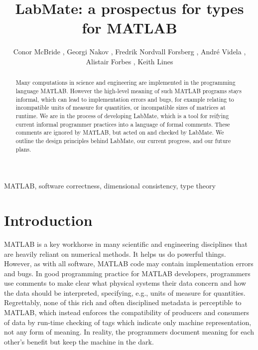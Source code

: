 \documentclass{IMEKO2024}
\begin{document}
\title{LabMate: a prospectus for types for MATLAB}
\author{Conor McBride  , Georgi Nakov  , Fredrik Nordvall Forsberg  , Andr\'e Videla  , Alistair Forbes  , Keith Lines  }
\maketitle

\begin{abstract}
  Many computations in science and engineering are implemented in the
  programming language MATLAB. However the high-level meaning of such
  MATLAB programs stays informal, which can lead to implementation
  errors and bugs, for example relating to incompatible units of
  measure for quantities, or incompatible sizes of matrices at
  runtime. We are in the process of developing LabMate, which is a
  tool for reifying current informal programmer practices into a
  language of formal comments. These comments are ignored by MATLAB,
  but acted on and checked by LabMate. We outline the design
  principles behind LabMate, our current progress, and our future
  plans.
\end{abstract}

\begin{keywords}
  MATLAB, software correctness, dimensional consistency, type theory
\end{keywords}

\section{Introduction}

MATLAB is a key workhorse in many scientific and engineering
disciplines that are heavily reliant on numerical methods. It helps us
do powerful things. However, as with all software, MATLAB code may
contain implementation errors and bugs. In good programming practice
for MATLAB developers, programmers use comments to make clear what
physical systems their data concern and how the data should be
interpreted, specifying, e.g., units of measure for
quantities. Regrettably, none of this rich and often disciplined
metadata is perceptible to MATLAB, which instead enforces the
compatibility of producers and consumers of data by run-time checking
of tags which indicate only machine representation, not any form of
meaning. In reality, the programmers document meaning for each other's
benefit but keep the machine in the dark.
\end{document}
